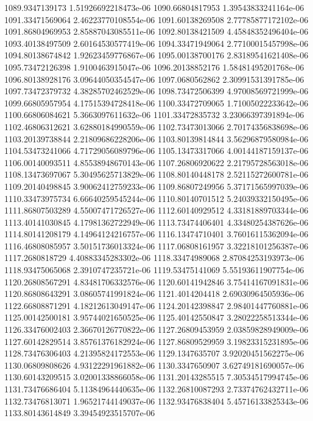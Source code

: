 {1089.9347139173 1.51926692218473e-06
1090.66804817953 1.39543833241164e-06
1091.33471569064 2.46223770108554e-06
1091.60138269508 2.77785877172102e-06
1091.86804969953 2.85887043085511e-06
1092.80138421509 4.45848352496404e-06
1093.40138497509 2.60164530577419e-06
1094.33471949064 2.77100015457998e-06
1094.80138674842 1.92623459776867e-06
1095.00138700176 2.83189541621408e-06
1095.73472126398 1.9100463915047e-06
1096.20138852176 1.58481495201768e-06
1096.80138928176 3.09644050354547e-06
1097.0680562862 2.30991531391785e-06
1097.73472379732 4.38285702462529e-06
1098.73472506399 4.97008569721999e-06
1099.66805957954 4.17515394728418e-06
1100.33472709065 1.71005022233642e-06
1100.66806084621 5.3663097611632e-06
1101.33472835732 3.23066397391894e-06
1102.46806312621 3.62880184990559e-06
1102.73473013066 2.70174356838698e-06
1103.20139738844 2.21809686228206e-06
1103.80139814844 3.56296879580984e-06
1104.53473241066 4.71729056089796e-06
1105.13473317066 4.00144187159137e-06
1106.00140093511 4.85538948670143e-06
1107.26806920622 2.21795728563018e-06
1108.13473697067 5.30495625713829e-06
1108.80140448178 2.52115272600781e-06
1109.20140498845 3.90062412759233e-06
1109.86807249956 5.37171565997039e-06
1110.33473975734 6.66640259545244e-06
1110.80140701512 5.24039332150495e-06
1111.86807503289 4.55007471726527e-06
1112.60140929512 4.33181889703344e-06
1113.40141030845 4.17981362722949e-06
1113.73474406401 4.33480254387626e-06
1114.80141208179 4.14964124216757e-06
1116.13474710401 3.76016115362094e-06
1116.46808085957 3.50151736013324e-06
1117.06808161957 3.32218101256387e-06
1117.2680818729 4.40883345283302e-06
1118.33474989068 2.87084253193973e-06
1118.93475065068 2.3910747235721e-06
1119.53475141069 5.55193611907754e-06
1120.26808567291 4.83481706332576e-06
1120.60141942846 3.75414167091831e-06
1120.86808643291 3.08605741991824e-06
1121.4014204418 2.69030964505936e-06
1122.66808871291 4.18212613049147e-06
1124.20142398847 2.98401447760881e-06
1125.00142500181 3.95744021650525e-06
1125.40142550847 3.28022258513344e-06
1126.33476002403 2.36670126770822e-06
1127.26809453959 2.03859828949009e-06
1127.60142829514 3.85761376182924e-06
1127.86809529959 3.19823315231895e-06
1128.73476306403 4.21395824172553e-06
1129.1347635707 3.92020451562275e-06
1130.06809808626 4.93122291961882e-06
1130.3347650907 3.62749181690057e-06
1130.60143209515 3.02001338866058e-06
1131.20143285515 7.30534517994745e-06
1131.73476686404 5.11384964440635e-06
1132.26810087293 2.73374762432711e-06
1132.73476813071 1.96521744149037e-06
1132.93476838404 5.45716133825343e-06
1133.80143614849 3.39454923515707e-06
}
